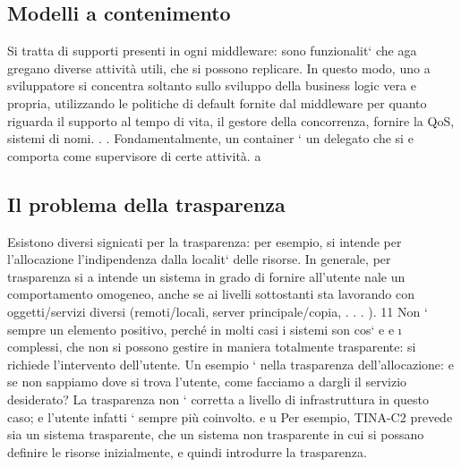 \documentclass[a4paper,12pt]{article}
\begin{document}
\subsection{Modelli a contenimento}
Si tratta di supporti presenti in ogni middleware: sono funzionalit` che aga
gregano diverse attività utili, che si possono replicare. In questo modo, uno
a
sviluppatore si concentra soltanto sullo sviluppo della business logic vera e
propria, utilizzando le politiche di default fornite dal middleware per quanto
riguarda il supporto al tempo di vita, il gestore della concorrenza, fornire la
QoS, sistemi di nomi. . . Fondamentalmente, un container ` un delegato che si
e
comporta come supervisore di certe attività.
a
\subsection{Il problema della trasparenza}
Esistono diversi signicati per la trasparenza: per esempio, si intende per l'allocazione l'indipendenza dalla localit`
delle risorse. In generale, per trasparenza si
a
intende un sistema in grado di fornire all'utente nale un comportamento omogeneo, anche se ai livelli sottostanti sta
lavorando con oggetti/servizi diversi
(remoti/locali, server principale/copia, . . . ).
11
Non ` sempre un elemento positivo, perché in molti casi i sistemi son cos`
e
e
\i{}
complessi, che non si possono gestire in maniera totalmente trasparente: si
richiede l'intervento dell'utente. Un esempio ` nella trasparenza dell'allocazione:
e
se non sappiamo dove si trova l'utente, come facciamo a dargli il servizio desiderato? La trasparenza non ` corretta a
livello di infrastruttura in questo caso;
e
l'utente infatti ` sempre più coinvolto.
e
u
Per esempio, TINA-C2 prevede sia un sistema trasparente, che un sistema
non trasparente in cui si possano definire le risorse inizialmente, e quindi introdurre la trasparenza.
\end{document}
